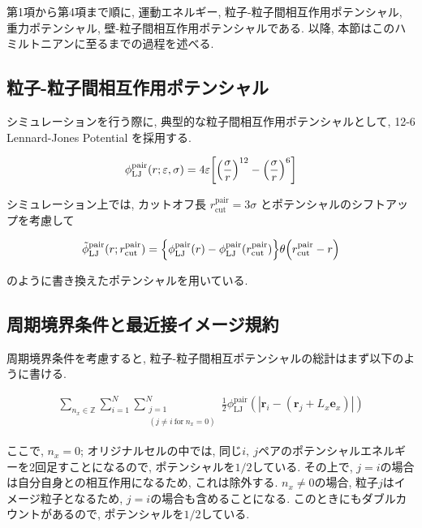 第1項から第4項まで順に, 運動エネルギー, 粒子-粒子間相互作用ポテンシャル, 重力ポテンシャル, 壁-粒子間相互作用ポテンシャルである. 以降, 本節はこのハミルトニアンに至るまでの過程を述べる.

\subsection{粒子-粒子間相互作用ポテンシャル}

シミュレーションを行う際に, 典型的な粒子間相互作用ポテンシャルとして, 12-6 Lennard-Jones Potential を採用する.

\begin{align}
  \phi_{\text{LJ}}^{\text{pair}}(r; \varepsilon, \sigma) = 4\varepsilon \qty[\qty(\frac{\sigma}{r})^{12} - \qty(\frac{\sigma}{r})^{6}] 
\end{align}

シミュレーション上では, カットオフ長 $r_{\text{cut}}^{\text{pair}}=3\sigma$ とポテンシャルのシフトアップを考慮して

\begin{align}
  \tilde{\phi}_{\text{LJ}}^{\text{pair}}(r;r_{\text{cut}}^{\text{pair}}) = \qty{\phi_{\text{LJ}}^{\text{pair}}(r) - \phi_{\text{LJ}}^{\text{pair}}(r_{\text{cut}}^{\text{pair}})}\theta \qty(r_{\text{cut}}^{\text{pair}}-r) \\
\end{align}

のように書き換えたポテンシャルを用いている.

\subsection{周期境界条件と最近接イメージ規約}

周期境界条件を考慮すると, 粒子-粒子間相互ポテンシャルの総計はまず以下のように書ける.\cite{MD}

\begin{align}
  \sum_{n_x \in \mathbb{Z}} \sum_{i=1}^{N} \sum_{\substack{j=1 \\ (j \neq i \ \text{for} \ n_{x} = 0)}}^{N} \frac{1}{2} \phi_{\text{LJ}}^{\text{pair}}(|\bm{r}_i -(\bm{r}_j + L_x \bm{e}_x)|) 
\end{align}

ここで, $n_x = 0$; オリジナルセルの中では, 同じ$i,\ j$ペアのポテンシャルエネルギーを2回足すことになるので, ポテンシャルを$1/2$している. その上で, $j = i$の場合は自分自身との相互作用になるため, これは除外する. $n_x \neq 0$の場合, 粒子$j$はイメージ粒子となるため, $j=i$の場合も含めることになる. このときにもダブルカウントがあるので, ポテンシャルを$1/2$している. 

